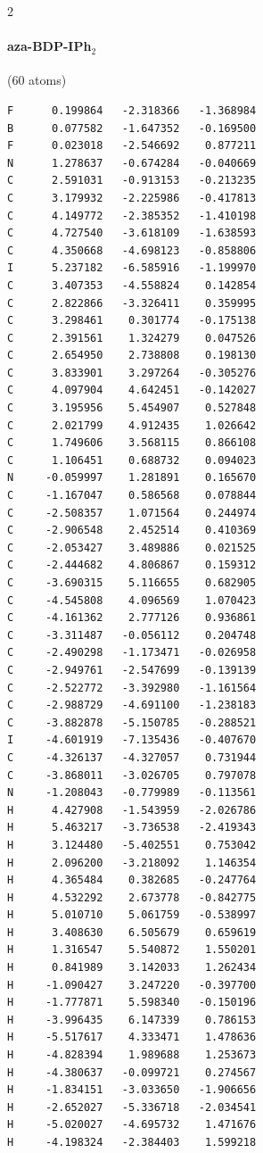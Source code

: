 \begin{multicols}{2}
\paragraph{aza-BDP-IPh$_2$} (60 atoms)
{\scriptsize\linespread{1}\selectfont\begin{verbatim}
F      0.199864   -2.318366   -1.368984
B      0.077582   -1.647352   -0.169500
F      0.023018   -2.546692    0.877211
N      1.278637   -0.674284   -0.040669
C      2.591031   -0.913153   -0.213235
C      3.179932   -2.225986   -0.417813
C      4.149772   -2.385352   -1.410198
C      4.727540   -3.618109   -1.638593
C      4.350668   -4.698123   -0.858806
I      5.237182   -6.585916   -1.199970
C      3.407353   -4.558824    0.142854
C      2.822866   -3.326411    0.359995
C      3.298461    0.301774   -0.175138
C      2.391561    1.324279    0.047526
C      2.654950    2.738808    0.198130
C      3.833901    3.297264   -0.305276
C      4.097904    4.642451   -0.142027
C      3.195956    5.454907    0.527848
C      2.021799    4.912435    1.026642
C      1.749606    3.568115    0.866108
C      1.106451    0.688732    0.094023
N     -0.059997    1.281891    0.165670
C     -1.167047    0.586568    0.078844
C     -2.508357    1.071564    0.244974
C     -2.906548    2.452514    0.410369
C     -2.053427    3.489886    0.021525
C     -2.444682    4.806867    0.159312
C     -3.690315    5.116655    0.682905
C     -4.545808    4.096569    1.070423
C     -4.161362    2.777126    0.936861
C     -3.311487   -0.056112    0.204748
C     -2.490298   -1.173471   -0.026958
C     -2.949761   -2.547699   -0.139139
C     -2.522772   -3.392980   -1.161564
C     -2.988729   -4.691100   -1.238183
C     -3.882878   -5.150785   -0.288521
I     -4.601919   -7.135436   -0.407670
C     -4.326137   -4.327057    0.731944
C     -3.868011   -3.026705    0.797078
N     -1.208043   -0.779989   -0.113561
H      4.427908   -1.543959   -2.026786
H      5.463217   -3.736538   -2.419343
H      3.124480   -5.402551    0.753042
H      2.096200   -3.218092    1.146354
H      4.365484    0.382685   -0.247764
H      4.532292    2.673778   -0.842775
H      5.010710    5.061759   -0.538997
H      3.408630    6.505679    0.659619
H      1.316547    5.540872    1.550201
H      0.841989    3.142033    1.262434
H     -1.090427    3.247220   -0.397700
H     -1.777871    5.598340   -0.150196
H     -3.996435    6.147339    0.786153
H     -5.517617    4.333471    1.478636
H     -4.828394    1.989688    1.253673
H     -4.380637   -0.099721    0.274567
H     -1.834151   -3.033650   -1.906656
H     -2.652027   -5.336718   -2.034541
H     -5.020027   -4.695732    1.471676
H     -4.198324   -2.384403    1.599218
\end{verbatim}}
\end{multicols}
